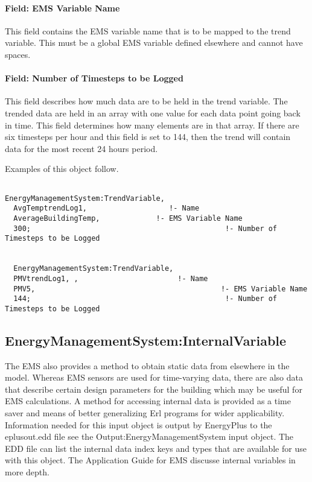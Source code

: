 \paragraph{Field: EMS Variable Name}\label{field-ems-variable-name-2}

This field contains the EMS variable name that is to be mapped to the trend variable. This must be a global EMS variable defined elsewhere and cannot have spaces.

\paragraph{Field: Number of Timesteps to be Logged}\label{field-number-of-timesteps-to-be-logged}

This field describes how much data are to be held in the trend variable. The trended data are held in an array with one value for each data point going back in time. This field determines how many elements are in that array. If there are six timesteps per hour and this field is set to 144, then the trend will contain data for the most recent 24 hours period.

Examples of this object follow.

\begin{lstlisting}

EnergyManagementSystem:TrendVariable,
  AvgTemptrendLog1,                   !- Name
  AverageBuildingTemp,             !- EMS Variable Name
  300;                                             !- Number of Timesteps to be Logged


  EnergyManagementSystem:TrendVariable,
  PMVtrendLog1, ,                       !- Name
  PMV5,                                           !- EMS Variable Name
  144;                                             !- Number of Timesteps to be Logged
\end{lstlisting}

\subsection{EnergyManagementSystem:InternalVariable}\label{energymanagementsysteminternalvariable}

The EMS also provides a method to obtain static data from elsewhere in the model. Whereas EMS sensors are used for time-varying data, there are also data that describe certain design parameters for the building which may be useful for EMS calculations. A method for accessing internal data is provided as a time saver and means of better generalizing Erl programs for wider applicability. Information needed for this input object is output by EnergyPlus to the eplusout.edd file see the Output:EnergyManagementSystem input object. The EDD file can list the internal data index keys and types that are available for use with this object. The Application Guide for EMS discusse internal variables in more depth.

